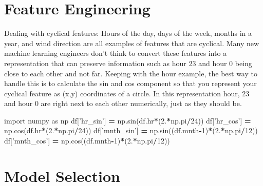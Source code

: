 \documentclass[]{book}
\newenvironment{Shaded}{\begin{snugshade}}{\end{snugshade}}
\newcommand{\DecValTok}[1]{\textcolor[rgb]{0.00,0.00,0.81}{#1}}
\newcommand{\StringTok}[1]{\textcolor[rgb]{0.31,0.60,0.02}{#1}}
\newcommand{\ImportTok}[1]{#1}
\newcommand{\OperatorTok}[1]{\textcolor[rgb]{0.81,0.36,0.00}{\textbf{#1}}}
\newcommand{\NormalTok}[1]{#1}
\theoremstyle{definition}
\theoremstyle{definition}
\theoremstyle{definition}
\theoremstyle{remark}
\begin{document}
\section{Feature Engineering}\label{feature-engineering}

Dealing with cyclical features: Hours of the day, days of the week,
months in a year, and wind direction are all examples of features that
are cyclical. Many new machine learning engineers don't think to convert
these features into a representation that can preserve information such
as hour 23 and hour 0 being close to each other and not far. Keeping
with the hour example, the best way to handle this is to calculate the
sin and cos component so that you represent your cyclical feature as
(x,y) coordinates of a circle. In this representation hour, 23 and hour
0 are right next to each other numerically, just as they should be.

\begin{Shaded}
\begin{Highlighting}[]
\ImportTok{import}\NormalTok{ numpy }\ImportTok{as}\NormalTok{ np}
\NormalTok{df[}\StringTok{'hr_sin'}\NormalTok{] }\OperatorTok{=}\NormalTok{ np.sin(df.hr}\OperatorTok{*}\NormalTok{(}\DecValTok{2}\NormalTok{.}\OperatorTok{*}\NormalTok{np.pi}\OperatorTok{/}\DecValTok{24}\NormalTok{))}
\NormalTok{df[}\StringTok{'hr_cos'}\NormalTok{] }\OperatorTok{=}\NormalTok{ np.cos(df.hr}\OperatorTok{*}\NormalTok{(}\DecValTok{2}\NormalTok{.}\OperatorTok{*}\NormalTok{np.pi}\OperatorTok{/}\DecValTok{24}\NormalTok{))}
\NormalTok{df[}\StringTok{'mnth_sin'}\NormalTok{] }\OperatorTok{=}\NormalTok{ np.sin((df.mnth}\OperatorTok{-}\DecValTok{1}\NormalTok{)}\OperatorTok{*}\NormalTok{(}\DecValTok{2}\NormalTok{.}\OperatorTok{*}\NormalTok{np.pi}\OperatorTok{/}\DecValTok{12}\NormalTok{))}
\NormalTok{df[}\StringTok{'mnth_cos'}\NormalTok{] }\OperatorTok{=}\NormalTok{ np.cos((df.mnth}\OperatorTok{-}\DecValTok{1}\NormalTok{)}\OperatorTok{*}\NormalTok{(}\DecValTok{2}\NormalTok{.}\OperatorTok{*}\NormalTok{np.pi}\OperatorTok{/}\DecValTok{12}\NormalTok{))}
\end{Highlighting}
\end{Shaded}

\section{Model Selection}\label{model-selection}
\end{document}
